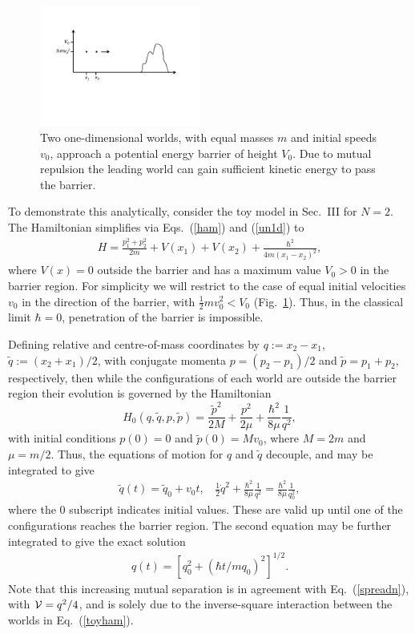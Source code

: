 \documentclass[twocolumn,aps,pra,amsmath,amssymb,superscriptaddress]{revtex4}
\renewcommand{\(}{\left(}
\renewcommand{\)}{\right)}
\newcommand{\blk}{\color{black}}
\begin{document}
\begin{figure}[!t]
	\centering
		\includegraphics[width=0.47\textwidth]{barrier.pdf}
	
\caption{Two one-dimensional worlds, with equal masses $m$ and initial speeds $v_0$, approach a potential energy barrier of height $V_0$. Due to mutual repulsion the leading world can gain sufficient kinetic energy to pass the barrier. \label{fig:barrier}}
\end{figure}


To demonstrate this analytically, consider the  toy model  in Sec.~III for $N=2$.  The  Hamiltonian simplifies via Eqs.~(\ref{ham}) and (\ref{un1d}) to
\begin{align} \label{toyham}
H = \frac{p_1^2+p_2^2}{2m} + V(x_1) + V(x_2) +\frac{\hbar^2}{4m(x_1-x_2)^2},
\end{align}
where $V(x)=0$ outside the barrier and has a maximum value $V_0>0$ in the barrier region. For simplicity we will restrict to the case of equal initial velocities $v_0$ in the direction of the barrier, with $\frac{1}{2}mv_0^2<V_0$ (Fig.~\ref{fig:barrier}).  Thus, in the classical limit $\hbar  = 0$, penetration of the barrier is impossible.

Defining relative and centre-of-mass coordinates by $q:=x_2-x_1$, $\tilde{q}:=(x_2+x_1)/2$, with conjugate momenta $p=(p_2-p_1)/2$ and $\tilde{p}=p_1+p_2$, respectively, then while the configurations of each world are outside the barrier region their evolution is governed by the Hamiltonian
\[ H_0(q,\tilde{q},p,\tilde{p}) = \frac{\tilde{p}^2}{2M} + \frac{p^2}{2\mu} + \frac{\hbar^2}{8\mu} \frac{1}{q^2}, \]
with initial conditions  $p(0)=0$ and $\tilde{p}(0) = Mv_0$, where $M=2m$ and $\mu=m/2$.  Thus, the equations of motion for $q$ and $\tilde{q}$ decouple, and may be integrated to give
\begin{align} \label{cons}
\tilde{q}(t)=\tilde{q}_0 + v_0 t,~~~~\frac{1}{2}\dot{q}^2 +  \frac{\hbar^2}{8\mu} \frac{1}{q^2} = \frac{\hbar^2}{8\mu} \frac{1}{q_0^2} ,
\end{align}
where the $0$ subscript indicates initial values. \blk These are valid up until one of the configurations reaches the barrier region. The second equation may be further integrated to give the exact solution
\begin{align}
q(t) = \left[q_0^2 + (\hbar t/mq_0)^2\right]^{1/2}.
\end{align}
Note that this increasing mutual separation is in agreement with Eq.~(\ref{spreadn}), with ${\cal V}=q^2/4$, 
and is solely due to the inverse-square interaction between the worlds in Eq.~(\ref{toyham}). 
\end{document}

